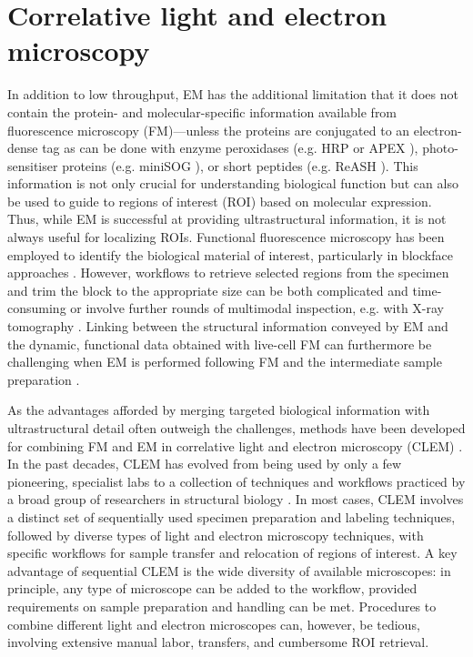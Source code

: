 \section{Correlative light and electron microscopy}
\label{sec:1_CLEM}

In addition to low throughput, EM has the additional limitation that it does not contain the protein- and molecular-specific information available from fluorescence microscopy (FM)---unless the proteins are conjugated to an electron-dense tag as can be done with enzyme peroxidases (e.g. HRP \cite{watts2004glia} or APEX \cite{martell2012engineered}), photo-sensitiser proteins (e.g. miniSOG \cite{shu2011genetically}), or short peptides (e.g. ReASH \cite{gaietta2002multicolor}). This information is not only crucial for understanding biological function but can also be used to guide to regions of interest (ROI) based on molecular expression. Thus, while EM is successful at providing ultrastructural information, it is not always useful for localizing ROIs. Functional fluorescence microscopy has been employed to identify the biological material of interest, particularly in blockface approaches \cite{karreman2016fast}. However, workflows to retrieve selected regions from the specimen and trim the block to the appropriate size can be both complicated and time-consuming or involve further rounds of multimodal inspection, e.g. with X-ray tomography \cite{karreman2016intravital}. Linking between the structural information conveyed by EM and the dynamic, functional data obtained with live-cell FM can furthermore be challenging when EM is performed following FM and the intermediate sample preparation \cite{lauf2002dynamic}.

As the advantages afforded by merging targeted biological information with ultrastructural detail often outweigh the challenges, methods have been developed for combining FM and EM in correlative light and electron microscopy (CLEM) \cite{de2015correlated}. In the past decades, CLEM has evolved from being used by only a few pioneering, specialist labs to a collection of techniques and workflows practiced by a broad group of researchers in structural biology \cite{de2015correlated, ando20182018}. In most cases, CLEM involves a distinct set of sequentially used specimen preparation and labeling techniques, followed by diverse types of light and electron microscopy techniques, with specific workflows for sample transfer and relocation of regions of interest. A key advantage of sequential CLEM is the wide diversity of available microscopes: in principle, any type of microscope can be added to the workflow, provided requirements on sample preparation and handling can be met. Procedures to combine different light and electron microscopes can, however, be tedious, involving extensive manual labor, transfers, and cumbersome ROI retrieval.


